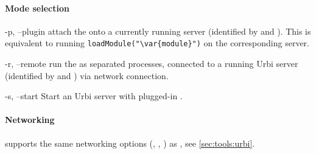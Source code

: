 \paragraph{Mode selection}
\begin{options}
\item[-p, --plugin] attach the  onto a currently running
  \urbi server (identified by  and ).  This is
  equivalent to running \lstinline|loadModule("\var{module}")| on the
  corresponding server.

\item[-r, --remote] run the  as separated processes,
  connected to a running Urbi server (identified by  and
  ) via network connection.

\item[-s, --start] Start an Urbi server with plugged-in .
\end{options}

\paragraph{Networking}
 supports the same networking options
(, , ) as
, see \autoref{sec:tools:urbi}.



